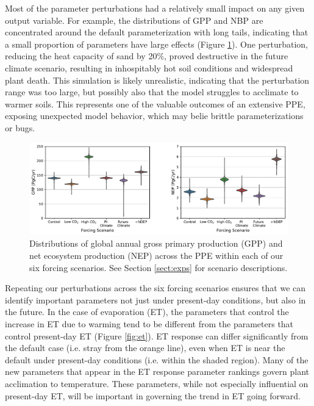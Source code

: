 \documentclass[draft]{agujournal2019}
\begin{document}
Most of the parameter perturbations had a relatively small impact on any given output variable. For example, the distributions of GPP and NBP are concentrated around the default parameterization with long tails, indicating that a small proportion of parameters have large effects (Figure \ref{fig:violins}). One perturbation, reducing the heat capacity of sand by 20\%, proved destructive in the future climate scenario, resulting in inhospitably hot soil conditions and widespread plant death. This simulation is likely unrealistic, indicating that the perturbation range was too large, but possibly also that the model struggles to acclimate to warmer soils. This represents one of the valuable outcomes of an extensive PPE, exposing unexpected model behavior, which may belie brittle parameterizations or bugs.

\begin{figure}[h]
\centering
\includegraphics[width=35pc]{../figs/violins.pdf}
\caption{Distributions of global annual gross primary production (GPP) and net ecosystem production (NEP) across the PPE within each of our six forcing scenarios. See Section \ref{sect:exps} for scenario descriptions.}
\label{fig:violins}
\end{figure}

Repeating our perturbations across the six forcing scenarios ensures that we can identify important parameters not just under present-day conditions, but also in the future. In the case of evaporation (ET), the parameters that control the increase in ET due to warming tend to be different from the parameters that control present-day ET (Figure \ref{fig:et}). 
ET response can differ significantly from the default case (i.e. stray from the orange line), even when ET is near the default under present-day conditions (i.e. within the shaded region).
Many of the new parameters that appear in the ET response parameter rankings govern plant acclimation to temperature. 
These parameters, while not especially influential on present-day ET, will be important in governing the trend in ET going forward.
\end{document}
